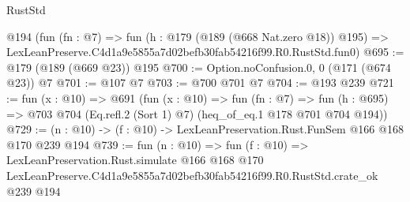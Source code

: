 \begin{lexlean}{RustStd}
\begin{coremodule}
    @194
    (fun (fn : @7) =>
    fun (h : @179 (@189 (@668 Nat.zero @18)) @195) =>
    LexLeanPreserve.C4d1a9e5855a7d02befb30fab54216f99.R0.RustStd.fun0)
@695 := @179 (@189 (@669 @23)) @195
@700 := Option.noConfusion.{0, 0} (@171 (@674 @23)) @7
@701 := @107 @7
@703 := @700 @701 @7
@704 := @193 @239
@721 := fun (x : @10) =>
  @691
    (fun (x : @10) =>
    fun (fn : @7) =>
    fun (h : @695) => @703 @704 (Eq.refl.{2} (Sort 1) @7) (heq_of_eq.{1} @178 @701 @704 @194))
@729 := (n : @10) -> (f : @10) -> LexLeanPreservation.Rust.FunSem @166 @168 @170 @239 @194
@739 := fun (n : @10) =>
  fun (f : @10) =>
  LexLeanPreservation.Rust.simulate
    @166
    @168
    @170
    LexLeanPreserve.C4d1a9e5855a7d02befb30fab54216f99.R0.RustStd.crate_ok
    @239
    @194
\end{coremodule}
\end{lexlean}
